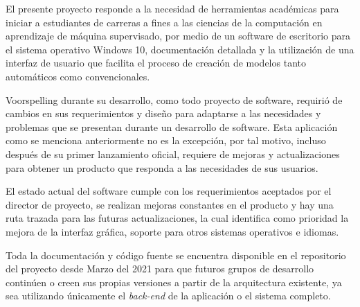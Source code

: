 El presente proyecto responde a la necesidad de herramientas académicas para iniciar a estudiantes de carreras a fines a las ciencias de la computación en aprendizaje de máquina supervisado, por medio de un software de escritorio para el sistema operativo Windows 10,  documentación detallada y la utilización de una interfaz de usuario que facilita el proceso de creación de modelos tanto automáticos como convencionales.

Voorspelling durante su desarrollo, como todo proyecto de software, requirió de cambios en sus requerimientos y diseño para adaptarse a las necesidades y problemas que se presentan durante un desarrollo de software. Esta aplicación como se menciona anteriormente no es la excepción, por tal motivo, incluso después de su primer lanzamiento oficial, requiere de mejoras y actualizaciones para obtener un producto que responda a las necesidades de sus usuarios.

El estado actual del software cumple con los requerimientos aceptados por el director de proyecto, se realizan mejoras constantes en el producto y hay una ruta trazada para las futuras actualizaciones, la cual identifica como prioridad la mejora de la interfaz gráfica, soporte para otros sistemas operativos e idiomas.

Toda la documentación y código fuente se encuentra disponible en el repositorio del proyecto desde Marzo del 2021 para que futuros grupos de desarrollo continúen o creen sus propias versiones a partir de la arquitectura existente, ya sea utilizando únicamente el \textit{back-end} de la aplicación o el sistema completo.
 
